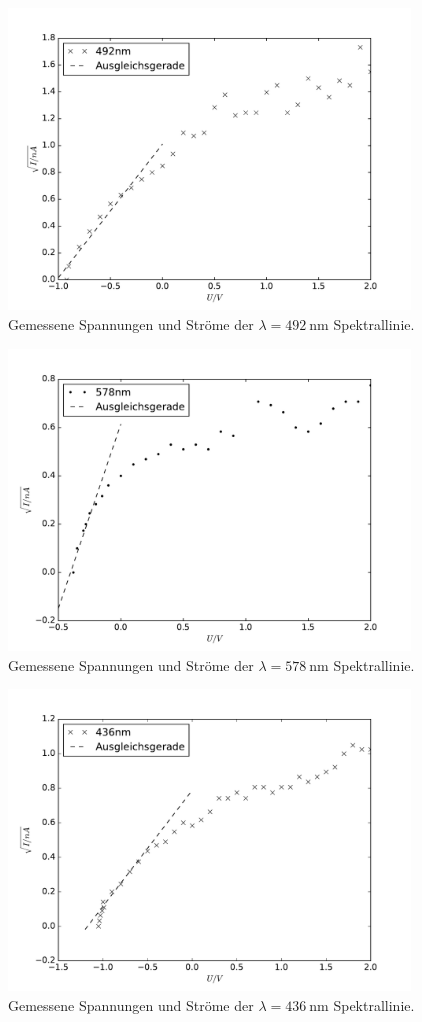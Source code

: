 \begin{figure}
  \centering
  \includegraphics[height = 8cm]{./plots/blau.pdf}
  \caption{Gemessene Spannungen und Ströme der $\lambda = \SI{492}{\nano\meter}$ Spektrallinie.}
  \label{fig:blau}
\end{figure}
\begin{figure}
  \centering
  \includegraphics[height = 8cm]{./plots/Orange.pdf}
  \caption{Gemessene Spannungen und Ströme der $\lambda = \SI{578}{\nano\meter}$ Spektrallinie.}
  \label{fig:orange}
\end{figure}
\begin{figure}
  \centering
  \includegraphics[height = 8cm]{./plots/blau2.pdf}
  \caption{Gemessene Spannungen und Ströme der $\lambda = \SI{436}{\nano\meter}$ Spektrallinie.}
  \label{fig:blau2}
\end{figure}
